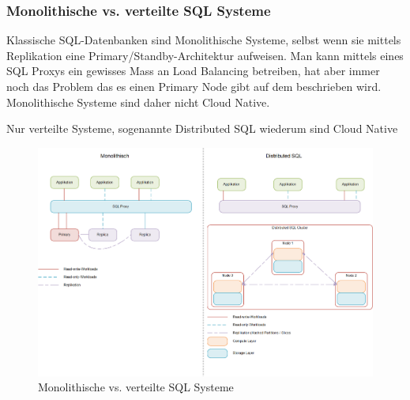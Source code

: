 
\subsubsection{Monolithische vs. verteilte SQL Systeme}
\begin{flushleft}
    Klassische SQL-Datenbanken sind Monolithische Systeme, selbst wenn sie mittels Replikation eine Primary/Standby-Architektur aufweisen.
    Man kann mittels eines SQL Proxys ein gewisses Mass an Load Balancing betreiben, hat aber immer noch das Problem das es einen Primary Node gibt auf dem beschrieben wird.
    Monolithische Systeme sind daher nicht Cloud Native.
\end{flushleft}
\begin{flushleft}
    Nur verteilte Systeme, sogenannte Distributed SQL wiederum sind Cloud Native

    \begin{figure}[H]
        \centering
        \includegraphics[width=1\linewidth]{source/implementation/evaluation/excursus_architecture/monolith_distributed}
        \caption{Monolithische vs. verteilte SQL Systeme}
        \label{fig:Monolith_vs_Distributed_SQL}
    \end{figure}
\end{flushleft}
